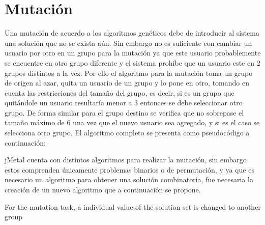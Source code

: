 \section{Mutación}

Una mutación de acuerdo a los algoritmos genéticos debe de introducir al sistema una solución que no se exista aún. Sin embargo no es suficiente con cambiar un usuario por otro en un grupo para la mutación ya que este usuario probablemente se encuentre en otro grupo diferente y el sistema prohíbe que un usuario este en 2 grupos distintos a la vez. Por ello el algoritmo para la mutación toma un grupo de origen al azar, quita un usuario de un grupo y lo pone en otro, tomando en cuenta las restricciones del tamaño del grupo, es decir, si es un grupo que quitándole un usuario resultaría menor a 3 entonces se debe seleccionar otro grupo. De forma similar para el grupo destino se verifica que no sobrepase el tamaño máximo de 6 una vez que el nuevo usuario sea agregado, y si es el caso se selecciona otro grupo. El algoritmo completo se presenta como pseudocódigo a continuación:


jMetal cuenta con distintos algoritmos para realizar la mutación, sin embargo estos comprenden únicamente problemas binarios o de permutación, y ya que es necesario un algoritmo para obtener una solución combinatoria, fue necesaria la creación de un nuevo algoritmo que a continuación se propone.

For the mutation task, a individual value of the solution set is changed to another group

